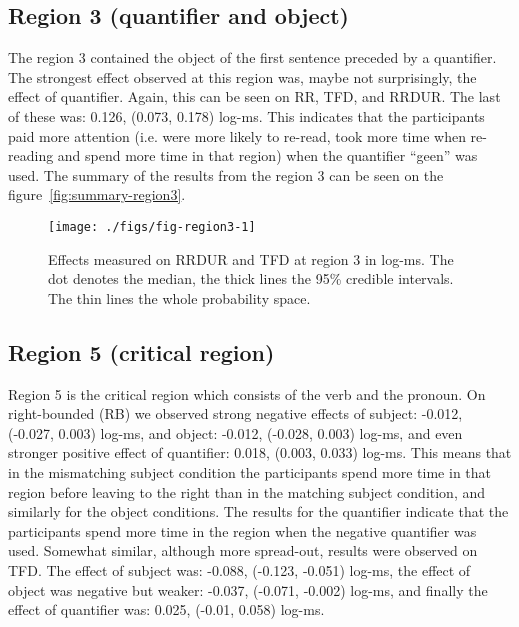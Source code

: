 \subsection{Region 3 (quantifier and object)}
The region 3 contained the object of the first
sentence preceded by a quantifier. The strongest effect observed at this region
was, maybe not surprisingly, the effect of quantifier. Again, this can be seen on RR, TFD, and RRDUR.
The last of these was: 0.126, (0.073, 0.178) log-ms. This indicates
that the participants paid more attention (i.e. were more likely to re-read, took more time when re-reading and spend more time in that region) when the quantifier ``geen'' was used. The summary of the results from the region 3 can be seen on the figure~\ref{fig:summary-region3}.

\begin{knitrout}
\color{fgcolor}\begin{figure}
\texttt{[image: ./figs/fig-region3-1]} \caption{\label{fig:summary-region3}Effects measured on RRDUR and TFD at region 3 in log-ms. The dot denotes the median, the thick lines the 95\% credible intervals. The thin lines the whole probability space.}\label{fig:fig-region3}
\end{figure}


\end{knitrout}
%



\subsection{Region 5 (critical region)}

Region 5 is the critical region which consists of the verb and the pronoun. On right-bounded (RB) we observed strong negative effects of subject: -0.012, (-0.027, 0.003) log-ms, and object: -0.012, (-0.028, 0.003) log-ms, and even stronger positive effect of quantifier: 0.018, (0.003, 0.033) log-ms. This means that in the mismatching subject condition the participants spend more time in that region before leaving to the right than in the matching subject condition, and similarly for the object conditions. The results for the quantifier indicate that the participants spend more time in the region when the negative quantifier was used.
Somewhat similar, although more spread-out, results were observed on TFD. The effect of subject was: -0.088, (-0.123, -0.051) log-ms, the effect of object was negative but weaker: -0.037, (-0.071, -0.002) log-ms, and finally the effect of quantifier was: 0.025, (-0.01, 0.058) log-ms.

